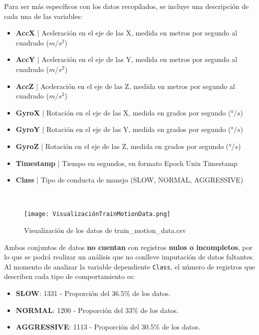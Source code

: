 \documentclass[spanish,12pt,letterpaper]{article}
\begin{document}
\textsc Para ser más específicos con los datos recopilados, se incluye una descripción de cada una de las variables:
\begin{itemize}
    \item \textbf{AccX} | Aceleración en el eje de las X, medida en metros por segundo al cuadrado ($m/s^2$)
    \item \textbf{AccY} | Aceleración en el eje de las Y, medida en metros por segundo al cuadrado ($m/s^2$)
    \item \textbf{AccZ }| Aceleración en el eje de las Z, medida en metros por segundo al cuadrado ($m/s^2$)
    \item \textbf{GyroX} | Rotación en el eje de las X, medida en grados por segundo (°$/s$)
    \item \textbf{GyroY} | Rotación en el eje de las Y, medida en grados por segundo (°$/s$)
    \item \textbf{GyroZ} | Rotación en el eje de las Z, medida en grados por segundo (°$/s$)
    \item \textbf{Timestamp} | Tiempo en segundos, en formato Epoch Unix Timestamp
    \item \textbf{Class} | Tipo de conducta de manejo (SLOW, NORMAL, AGGRESSIVE)
\end{itemize} \\

    \begin{figure}[htb]
        \centering
        \texttt{[image: VisualizaciónTrainMotionData.png]}
        \caption{Visualización de los datos de train\_motion\_data.csv}
        \label{fig:comand}%
    \end{figure}

\textsc Ambos conjuntos de datos \textbf{no cuentan} con registros \textbf{nulos o incompletos}, por lo que se podrá realizar un análisis que no conlleve imputación de datos faltantes. Al momento de analizar la variable dependiente \verb|Class|, el número de registros que describen cada tipo de comportamiento es:

\begin{itemize}
    \item \textbf{SLOW}: 1331 - Proporción del 36.5\% de los datos.
    \item \textbf{NORMAL}: 1200 - Proporción del 33\% de los datos.
    \item \textbf{AGGRESSIVE}: 1113 - Proporción del 30.5\% de los datos.
\end{itemize}
\end{document}
